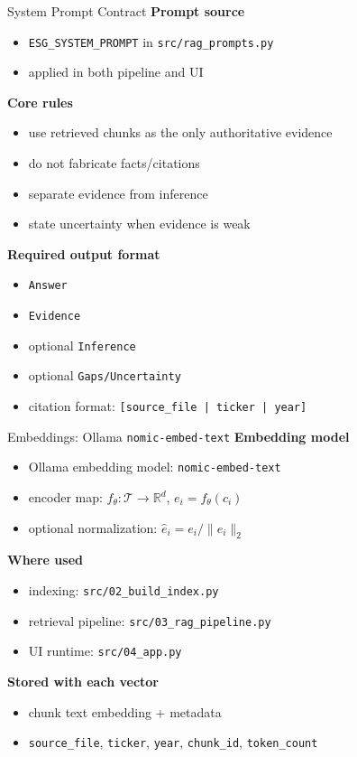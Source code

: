 \documentclass{beamer}
\begin{document}
\begin{frame}{System Prompt Contract}
\small
\textbf{Prompt source}
\begin{itemize}
  \item \texttt{ESG\_SYSTEM\_PROMPT} in \texttt{src/rag\_prompts.py}
  \item applied in both pipeline and UI
\end{itemize}

\textbf{Core rules}
\begin{itemize}
  \item use retrieved chunks as the only authoritative evidence
  \item do not fabricate facts/citations
  \item separate evidence from inference
  \item state uncertainty when evidence is weak
\end{itemize}

\textbf{Required output format}
\begin{itemize}
  \item \texttt{Answer}
  \item \texttt{Evidence}
  \item optional \texttt{Inference}
  \item optional \texttt{Gaps/Uncertainty}
  \item citation format: \texttt{[source\_file | ticker | year]}
\end{itemize}
\end{frame}

\begin{frame}{Embeddings: Ollama \texttt{nomic-embed-text}}
\small
\textbf{Embedding model}
\begin{itemize}
  \item Ollama embedding model: \texttt{nomic-embed-text}
  \item encoder map: \(f_{\theta}: \mathcal{T} \rightarrow \mathbb{R}^{d}\), \(e_i=f_{\theta}(c_i)\)
  \item optional normalization: \(\hat{e}_i = e_i / \|e_i\|_2\)
\end{itemize}

\textbf{Where used}
\begin{itemize}
  \item indexing: \texttt{src/02\_build\_index.py}
  \item retrieval pipeline: \texttt{src/03\_rag\_pipeline.py}
  \item UI runtime: \texttt{src/04\_app.py}
\end{itemize}

\textbf{Stored with each vector}
\begin{itemize}
  \item chunk text embedding + metadata
  \item \texttt{source\_file}, \texttt{ticker}, \texttt{year}, \texttt{chunk\_id}, \texttt{token\_count}
\end{itemize}
\end{frame}
\end{document}
